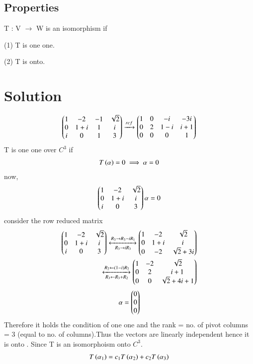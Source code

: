 \documentclass[journal,12pt,twocolumn]{IEEEtran}
\begin{document}
\subsection{Properties}
T : V $\rightarrow$ W is an isomorphism if
 
 (1) T is one one.
 
 (2) T is onto.
\section{Solution}
\begin{align}
\begin{pmatrix}1&-2&-1&\sqrt{2}\\0&1+i&1&i\\i&0&1&3\end{pmatrix}\xrightarrow[]{ref}\begin{pmatrix}1&0&-i&-3i\\0&2&1-i&i+1\\0&0&0&1\end{pmatrix}
\end{align}
T is one one over $C^{3}$ if 
\begin{align}
    T\left(\alpha\right)=0 \implies \alpha =0
\end{align}
now,
\begin{align}
 \begin{pmatrix}1&-2&\sqrt{2}\\0&1+i&i\\i&0&3\end{pmatrix}\alpha = 0
\end{align}
consider the row reduced matrix
\begin{align}
    \begin{pmatrix}1&-2&\sqrt{2}\\0&1+i&i\\i&0&3\end{pmatrix}
    \xleftrightarrow[R_3\rightarrow i R_3]{R_3\rightarrow R_3-iR_1}\begin{pmatrix}1&-2&\sqrt{2}\\0&1+i&i\\0&-2&\sqrt{2}+3i\end{pmatrix}\\
    \xleftrightarrow[R_3\leftarrow R_3+R_2]{R_2\leftarrow (1-i)R_2}\begin{pmatrix}1&-2&\sqrt{2}\\0&2&i+1\\0&0&\sqrt{2}+4i+1\end{pmatrix}
\end{align}
\begin{align}
    \mathbf{\alpha} = \begin{pmatrix}0\\0\\0\end{pmatrix}
\end{align}
Therefore it holds the condition of one one and the rank = no. of pivot columns = 3 (equal to no. of columns).Thus the  vectors are linearly independent hence it is onto . Since T is an isomorphoism onto $C^{3}$. 
  \begin{align}
  T\left(\alpha_1\right) = c_1T\left(\alpha_2\right)+c_2T\left(\alpha_3\right)\label{pr}  
\end{align}
\end{document}
